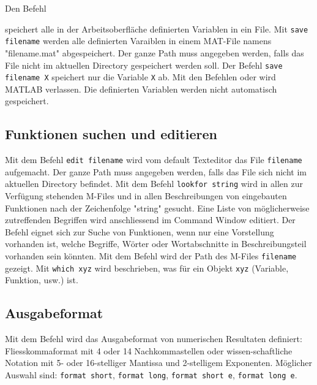 Den Befehl { speichert alle in der Arbeitsoberfläche definierten Variablen in ein File. Mit {\color{red}\texttt{save filename}} werden alle definierten Varaiblen in einem MAT-File namens "filename.mat" abgespeichert. Der ganze Path muss angegeben werden, falls das File nicht im aktuellen Directory gespeichert werden soll. Der Befehl {\color{red}\texttt{save filename X}} speichert nur die Variable \texttt{X} ab.
\newline\newline
Mit den Befehlen  oder  wird MATLAB verlassen. Die definierten Variablen werden nicht automatisch gespeichert.
\subsection{Funktionen suchen und editieren}
Mit dem Befehl {\color{red}\texttt{edit filename}} wird vom default Texteditor das File \texttt{filename} aufgemacht. Der ganze Path muss angegeben werden, falls das File sich nicht im aktuellen Directory befindet. Mit dem Befehl {\color{red}\texttt{lookfor string}} wird in allen zur Verfügung stehenden M-Files und in allen Beschreibungen von eingebauten Funktionen nach der Zeichenfolge "string" gesucht. Eine Liste von möglicherweise zutreffenden Begriffen wird anschliessend im Command Window editiert. Der Befehl  eignet sich zur Suche von Funktionen, wenn nur eine Vorstellung vorhanden ist, welche Begriffe, Wörter oder Wortabschnitte in Beschreibungsteil vorhanden sein könnten.
\newline\newline
Mit dem Befehl  wird der Path des M-Files \texttt{filename} gezeigt. Mit {\color{red}\texttt{which xyz}} wird beschrieben, was für ein Objekt \texttt{xyz} (Variable, Funktion, usw.) ist.
\subsection{Ausgabeformat}
Mit dem Befehl  wird das Ausgabeformat von numerischen Resultaten definiert: Fliesskommaformat mit 4 oder 14 Nachkommastellen oder wissen-schaftliche Notation mit 5- oder 16-stelliger Mantissa und 2-stelligem Exponenten. Möglicher Auswahl sind: {\color{red}\texttt{format short}}, {\color{red}\texttt{format long}}, {\color{red}\texttt{format short e}}, {\color{red}\texttt{format long e}}.
}
